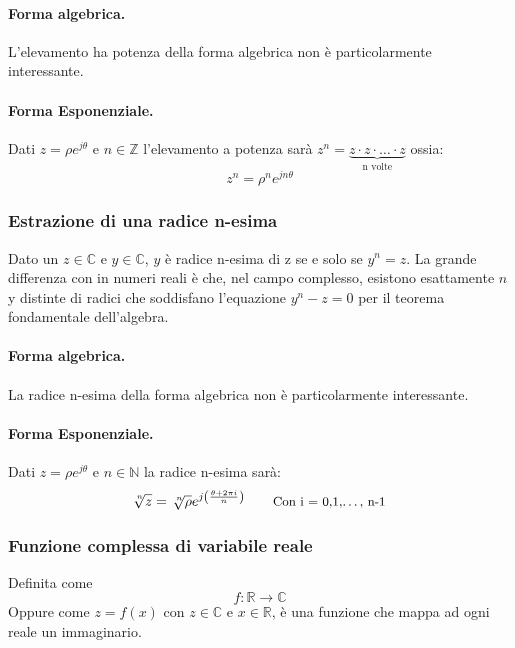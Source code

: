 \paragraph{Forma algebrica.} L'elevamento ha potenza della forma algebrica non è particolarmente interessante.
\paragraph{Forma Esponenziale.} Dati $z = \rho e^{j\theta}$ e $n \in \mathbb{Z}$ l'elevamento a potenza sarà $z ^ n = \underbrace{z\cdot z\cdot \ldots \cdot z}_{\mbox{n volte}}$ ossia:
\begin{equation}
    z^n = \rho^ne^{jn\theta}
\end{equation}


\subsubsection{Estrazione di una radice n-esima}
Dato un $z \in \mathbb{C}$ e $y \in \mathbb{C}$, $y$ è radice n-esima di z se e solo se $y^n = z$. 
La grande differenza con in numeri reali è che, nel campo complesso, esistono esattamente $n$ y distinte di radici che soddisfano l'equazione $y^n - z = 0$ per il teorema fondamentale dell'algebra.  
\paragraph{Forma algebrica.} La radice n-esima della forma algebrica non è particolarmente interessante.
\paragraph{Forma Esponenziale.} Dati $z = \rho e^{j\theta}$ e $n \in \mathbb{N}$ la radice n-esima sarà:
\begin{equation}
    \sqrt[\leftroot{-2}\uproot{2}n]{z} = \sqrt[\leftroot{-2}\uproot{2}n]{\rho}e^{j\left(\frac{\theta + 2\pi i}{n}\right)} \tag*{\small Con i = 0,1,\dots, n-1 \normalsize}
\end{equation}

\subsubsection{Funzione complessa di variabile reale}
Definita come
\begin{equation*}
    f : \mathbb{R} \longrightarrow \mathbb{C}
\end{equation*}
Oppure come $z = f(x)$ con $z \in \mathbb{C}$ e $x \in \mathbb{R}$, è una funzione che mappa ad ogni reale un immaginario.
